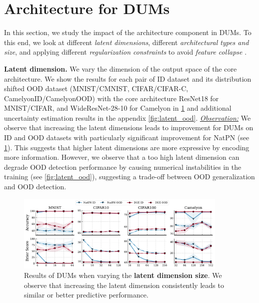 \section{Architecture for DUMs}
\label{sec:architecture}

In this section, we study the impact of the architecture component in DUMs. To this end, we look at different \emph{latent dimensions}, different \emph{architectural types and size}, and applying different \emph{regularization constraints} to avoid \textit{feature collapse} \citep{due}. 

\textbf{Latent dimension.} We vary the dimension of the output space of the core architecture. We show the results for each pair of ID dataset and its distribution shifted OOD dataset (MNIST/CMNIST, CIFAR/CIFAR-C, CamelyonID/CamelyonOOD) with the core architecture ResNet18 for MNIST/CIFAR, and WideResNet-28-10 for Camelyon in \cref{fig:latent} and additional uncertainty estimation results in the appendix \cref{fig:latent_ood}. \underline{\textit{Observation:}} We observe that increasing the latent dimensions leads to improvement for DUMs on ID and OOD datasets with particularly significant improvement for NatPN (see \cref{fig:latent}). This suggests that higher latent dimensions are more expressive by encoding more information. However, we observe that  a too high latent dimension can degrade OOD detection performance by causing numerical instabilities in the training (see \cref{fig:latent_ood}), suggesting a trade-off between OOD generalization and OOD detection.

\begin{figure}[!htb]
    \centering
    \includegraphics[width=0.9\textwidth]{sections/008_iclr2023/figures/latent.pdf}
    \caption{Results of DUMs when varying the \textbf{latent dimension size}. We observe that increasing the latent dimension consistently leads to similar or better predictive performance.}
    \label{fig:latent}
\end{figure}

